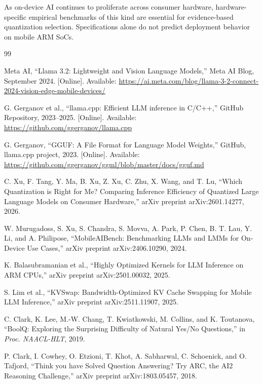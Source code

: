 \documentclass[conference]{IEEEtran}
\begin{document}
As on-device AI continues to proliferate across consumer hardware, hardware-specific
empirical benchmarks of this kind are essential for evidence-based quantization
selection. Specifications alone do not predict deployment behavior on mobile
ARM SoCs.

\begin{thebibliography}{99}

Meta AI, ``Llama 3.2: Lightweight and Vision Language Models,''
Meta AI Blog, September 2024. [Online]. Available:
\url{https://ai.meta.com/blog/llama-3-2-connect-2024-vision-edge-mobile-devices/}

G. Gerganov et al., ``llama.cpp: Efficient LLM inference in C/C++,''
GitHub Repository, 2023--2025. [Online]. Available:
\url{https://github.com/ggerganov/llama.cpp}

G. Gerganov, ``GGUF: A File Format for Language Model Weights,''
GitHub, llama.cpp project, 2023. [Online]. Available:
\url{https://github.com/ggerganov/ggml/blob/master/docs/gguf.md}

C. Xu, F. Tang, Y. Ma, B. Xu, Z. Xu, C. Zhu, X. Wang, and T. Lu,
``Which Quantization is Right for Me? Comparing Inference Efficiency of Quantized Large
Language Models on Consumer Hardware,''
arXiv preprint arXiv:2601.14277, 2026.

W. Murugadoss, S. Xu, S. Chandra, S. Movva, A. Park, P. Chen, B. T. Lau,
Y. Li, and A. Philipose,
``MobileAIBench: Benchmarking LLMs and LMMs for On-Device Use Cases,''
arXiv preprint arXiv:2406.10290, 2024.

K. Balasubramanian et al.,
``Highly Optimized Kernels for LLM Inference on ARM CPUs,''
arXiv preprint arXiv:2501.00032, 2025.

S. Lim et al.,
``KVSwap: Bandwidth-Optimized KV Cache Swapping for Mobile LLM Inference,''
arXiv preprint arXiv:2511.11907, 2025.

C. Clark, K. Lee, M.-W. Chang, T. Kwiatkowski, M. Collins, and K. Toutanova,
``BoolQ: Exploring the Surprising Difficulty of Natural Yes/No Questions,''
in \textit{Proc. NAACL-HLT}, 2019.

P. Clark, I. Cowhey, O. Etzioni, T. Khot, A. Sabharwal, C. Schoenick, and O. Tafjord,
``Think you have Solved Question Answering? Try ARC, the AI2 Reasoning Challenge,''
arXiv preprint arXiv:1803.05457, 2018.


\end{thebibliography}
\end{document}
